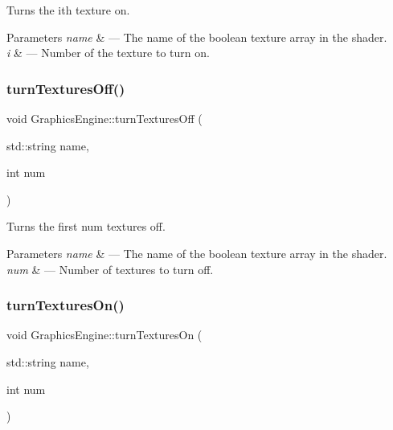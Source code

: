 Turns the ith texture on. 


\begin{DoxyParams}{Parameters}
{\em name} & --- The name of the boolean texture array in the shader.\\
\hline
{\em i} & --- Number of the texture to turn on. \\
\hline
\end{DoxyParams}
\mbox{\label{class_graphics_engine_a13a43684e7a53ff0c39b7ef014a8d121}} 
\subsubsection{\texorpdfstring{turn\+Textures\+Off()}{turnTexturesOff()}}
{\footnotesize\ttfamily void Graphics\+Engine\+::turn\+Textures\+Off (\begin{DoxyParamCaption}\item[{std\+::string}]{name,  }\item[{int}]{num }\end{DoxyParamCaption})}



Turns the first num textures off. 


\begin{DoxyParams}{Parameters}
{\em name} & --- The name of the boolean texture array in the shader.\\
\hline
{\em num} & --- Number of textures to turn off. \\
\hline
\end{DoxyParams}
\mbox{\label{class_graphics_engine_a93d13fafc47d86e42a2d62b874af152d}} 
\subsubsection{\texorpdfstring{turn\+Textures\+On()}{turnTexturesOn()}}
{\footnotesize\ttfamily void Graphics\+Engine\+::turn\+Textures\+On (\begin{DoxyParamCaption}\item[{std\+::string}]{name,  }\item[{int}]{num }\end{DoxyParamCaption})}



